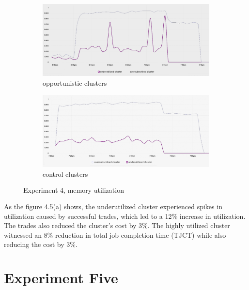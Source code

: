 \begin{figure}[H]
\centering
\begin{subfigure}{.5\textwidth}
  \centering
  \includegraphics[width=.9\linewidth]{./figures/experiment-four/exp4-incentives-2.png}
  \caption{opportunistic clusters}
  \label{fig:exp4oop}
\end{subfigure}%
\begin{subfigure}{.5\textwidth}
  \centering
  \includegraphics[width=.9\linewidth]{./figures/experiment-four/exp4-incentives-control-2.png}
  \caption{control clusters}
  \label{fig:exp4control}
\end{subfigure}
\caption{Experiment 4, memory utilization}
\label{fig:exp4memutil}
\end{figure}

As the figure 4.5(a) shows, the underutilized cluster experienced spikes in
utilization caused by successful trades, which led to a 12\% increase in
utilization. The trades also reduced the cluster's cost by 3\%. The highly
utilized cluster witnessed an 8\% reduction in total job completion time (TJCT)
while also reducing the cost by 3\%.

\section{Experiment Five}

